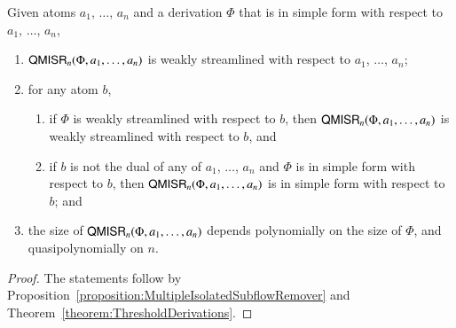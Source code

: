 
\begin{proposition}\label{proposition:QuasipolynomialMultipleIsolatedSubflowRemover}
Given atoms $a_1$, $\dots$, $a_n$ and a derivation $\Phi$ that is in simple form with respect to $a_1$, $\dots$, $a_n$,
\begin{enumerate}
\item $\mathsf{QMISR}_n(\Phi,a_1,\dots,a_n)$ is weakly streamlined with respect to $a_1$, $\dots$, $a_n$;
\item for any atom $b$,
\begin{enumerate}
\item if $\Phi$ is weakly streamlined with respect to $b$, then $\mathsf{QMISR}_n(\Phi,a_1,\dots,a_n)$ is weakly streamlined with respect to $b$, and
\item if $b$ is not the dual of any of $a_1$, $\dots$, $a_n$ and $\Phi$ is in simple form with respect to $b$, then $\mathsf{QMISR}_n(\Phi,a_1,\dots,a_n)$ is in simple form with respect to $b$; and
\end{enumerate}
\item the size of\/ $\mathsf{QMISR}_n(\Phi,a_1,\dots,a_n)$ depends polynomially on the size of\/ $\Phi$, and quasipolynomially on $n$.
\end{enumerate}
\end{proposition}

\begin{proof}
The statements follow by Proposition~\vref{proposition:MultipleIsolatedSubflowRemover} and Theorem~\vref{theorem:ThresholdDerivations}.
\end{proof}
